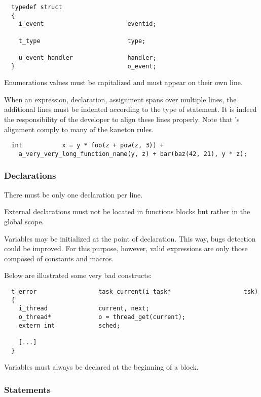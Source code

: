 \begin{verbatim}
  typedef struct
  {
    i_event                       eventid;

    t_type                        type;

    u_event_handler               handler;
  }                               o_event;
\end{verbatim}

Enumerations values must be capitalized and must appear on their own line.

When an expression, declaration, assignment \etc{} spans over multiple lines,
the additional lines must be indented according to the type of statement.
It is indeed the responsibility of the developer to align these lines
properly. Note that 's alignment comply to many of the
kaneton rules.

\begin{verbatim}
  int           x = y * foo(z + pow(z, 3)) +
    a_very_very_long_function_name(y, z) + bar(baz(42, 21), y * z);
\end{verbatim}


\subsubsection{Declarations}

There must be only one declaration per line.

External declarations must not be located in functions blocks but rather in the
global scope.

Variables may be initialized at the point of declaration. This way, bugs
detection could be improved. For this purpose, however, valid expressions
are only those composed of constants and macros.

Below are illustrated some very bad constructs:

\begin{verbatim}
  t_error                 task_current(i_task*                    tsk)
  {
    i_thread              current, next;
    o_thread*             o = thread_get(current);
    extern int            sched;

    [...]
  }
\end{verbatim}

Variables must always be declared at the beginning of a block.


\subsubsection{Statements}


